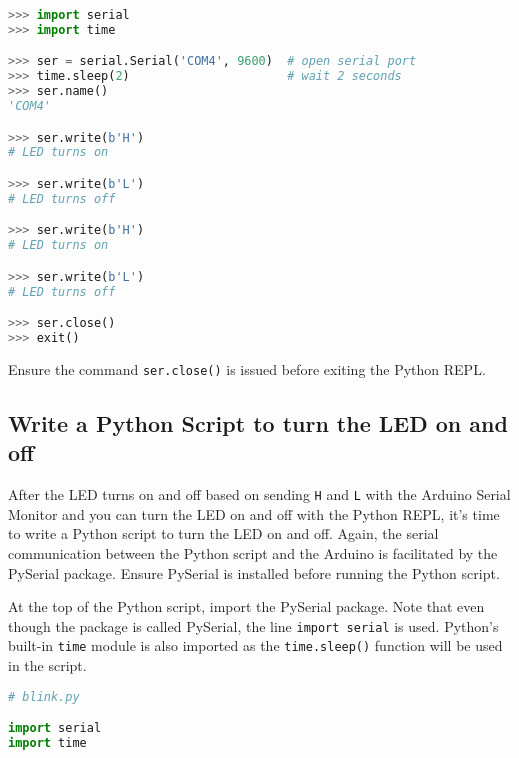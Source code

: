 \documentclass{book}
\newcommand{\passthrough}[1]{#1}
\begin{document}
\begin{lstlisting}[language=Python]
>>> import serial
>>> import time

>>> ser = serial.Serial('COM4', 9600)  # open serial port
>>> time.sleep(2)                      # wait 2 seconds
>>> ser.name()
'COM4'

>>> ser.write(b'H')
# LED turns on

>>> ser.write(b'L')
# LED turns off

>>> ser.write(b'H')
# LED turns on

>>> ser.write(b'L')
# LED turns off

>>> ser.close()
>>> exit()
\end{lstlisting}

Ensure the command \passthrough{\lstinline!ser.close()!} is issued
before exiting the Python REPL.
    




    
        \hypertarget{write-a-python-script-to-turn-the-led-on-and-off}{%
\subsection{Write a Python Script to turn the LED on and
off}\label{write-a-python-script-to-turn-the-led-on-and-off}}
    




    
        After the LED turns on and off based on sending
\passthrough{\lstinline!H!} and \passthrough{\lstinline!L!} with the
Arduino Serial Monitor and you can turn the LED on and off with the
Python REPL, it's time to write a Python script to turn the LED on and
off. Again, the serial communication between the Python script and the
Arduino is facilitated by the PySerial package. Ensure PySerial is
installed before running the Python script.

At the top of the Python script, import the PySerial package. Note that
even though the package is called PySerial, the line
\passthrough{\lstinline!import serial!} is used. Python's built-in
\passthrough{\lstinline!time!} module is also imported as the
\passthrough{\lstinline!time.sleep()!} function will be used in the
script.
    




    
        \begin{lstlisting}[language=Python]
# blink.py

import serial
import time
\end{lstlisting}
    
\end{document}
